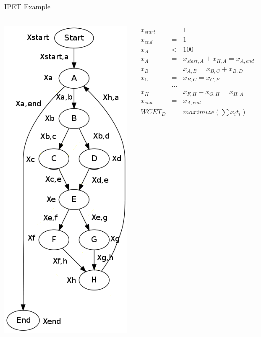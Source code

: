 \documentclass{beamer}
\begin{document}
\begin{frame}{IPET Example}
  \begin{columns}
    \begin{column}{0.25\textwidth}
      \includegraphics[scale=0.3]{ipetoutput.png}
    \end{column}
    \begin{column}{0.75\textwidth}
      \begin{eqnarray*}
        x_{start} &=& 1 \\
        x_{end} &=& 1 \\
        x_A &<& 100 \\
        x_A &=& x_{start,A} + x_{H,A} = x_{A,end} + x_{A,B} \\
        x_B &=& x_{A,B} = x_{B,C} + x_{B,D} \\
        x_C &=& x_{B,C} = x_{C,E} \\
        &\dots& \\
        x_H &=& x_{F,H} + x_{G,H} = x_{H,A} \\
        x_{end} &=& x_{A,end} \\
        WCET_D &=& maximize(\sum x_it_i)
      \end{eqnarray*}
    \end{column}
  \end{columns}
\end{frame}
\end{document}
